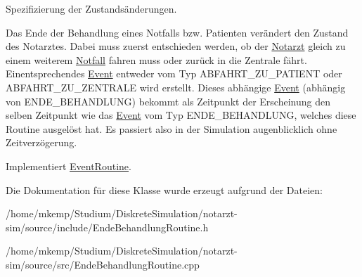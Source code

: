 Spezifizierung der Zustandsänderungen. 

Das Ende der Behandlung eines Notfalls bzw. Patienten verändert den Zustand des Notarztes. Dabei muss zuerst entschieden werden, ob der \hyperlink{classNotarzt}{Notarzt} gleich zu einem weiterem \hyperlink{classNotfall}{Notfall} fahren muss oder zurück in die Zentrale fährt. Einentsprechendes \hyperlink{classEvent}{Event} entweder vom Typ A\+B\+F\+A\+H\+R\+T\+\_\+\+Z\+U\+\_\+\+P\+A\+T\+I\+E\+NT oder A\+B\+F\+A\+H\+R\+T\+\_\+\+Z\+U\+\_\+\+Z\+E\+N\+T\+R\+A\+LE wird erstellt. Dieses abhängige \hyperlink{classEvent}{Event} (abhängig von E\+N\+D\+E\+\_\+\+B\+E\+H\+A\+N\+D\+L\+U\+NG) bekommt als Zeitpunkt der Erscheinung den selben Zeitpunkt wie das \hyperlink{classEvent}{Event} vom Typ E\+N\+D\+E\+\_\+\+B\+E\+H\+A\+N\+D\+L\+U\+NG, welches diese Routine ausgelöst hat. Es passiert also in der Simulation augenblicklich ohne Zeitverzögerung. 

Implementiert \hyperlink{classEventRoutine_aede9b0fdb576a4a262ced2d7d6548c14}{Event\+Routine}.



Die Dokumentation für diese Klasse wurde erzeugt aufgrund der Dateien\+:\begin{DoxyCompactItemize}
\item 
/home/mkemp/\+Studium/\+Diskrete\+Simulation/notarzt-\/sim/source/include/Ende\+Behandlung\+Routine.\+h\item 
/home/mkemp/\+Studium/\+Diskrete\+Simulation/notarzt-\/sim/source/src/Ende\+Behandlung\+Routine.\+cpp\end{DoxyCompactItemize}
